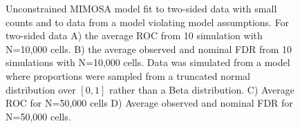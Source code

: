 \documentclass{article}
\begin{document}
\begin{figure}
\begin{tikzpicture} [auto,node distance=0cm]
 \end{tikzpicture}
   \caption{Unconstrained MIMOSA model fit to two-sided data with small
     counts  and to  data from a model
     violating model assumptions.  For two-sided data A) the average ROC from 10 simulation
     with N=10,000 cells. B) the average observed and nominal FDR from
     10 simulations with N=10,000 cells. Data was simulated from a model where proportions were
     sampled from a truncated normal distribution over $[0,1]$ rather
     than a Beta distribution. C) Average ROC for N=50,000
     cells D) Average observed and nominal FDR for N=50,000 cells.
}
   \label{webfig:simulations_trunc}
\end{figure}
\clearpage
\end{document}
